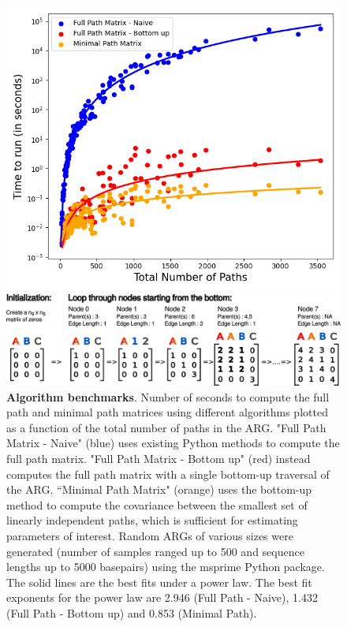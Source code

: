 \begin{figure}[h!]
    \centering
    \includegraphics[width=0.75\linewidth]{Images/SupplementaryFigures/Algorithm/Benchmark.png}
    
    \includegraphics[width=\linewidth]{Images/SupplementaryFigures/Algorithm/AlgorithmExample.png}
    \caption{\textbf{Algorithm benchmarks}. Number of seconds to compute the full path and minimal path matrices using different algorithms plotted as a function of the total number of paths in the ARG. "Full Path Matrix - Naive" (blue) uses existing Python methods to compute the full path matrix. "Full Path Matrix - Bottom up" (red) instead computes the full path matrix with a single bottom-up traversal of the ARG. ``Minimal Path Matrix" (orange) uses the bottom-up method to compute the covariance between the smallest set of linearly independent paths, which is sufficient for estimating parameters of interest. Random ARGs of various sizes were generated (number of samples ranged up to 500 and sequence lengths up to 5000 basepairs) using the msprime Python package. The solid lines are the best fits under a power law. The best fit exponents for the power law are 2.946 (Full Path - Naive), 1.432 (Full Path - Bottom up) and 0.853 (Minimal Path).}
    \label{fig:algo_and_bench}
\end{figure}


